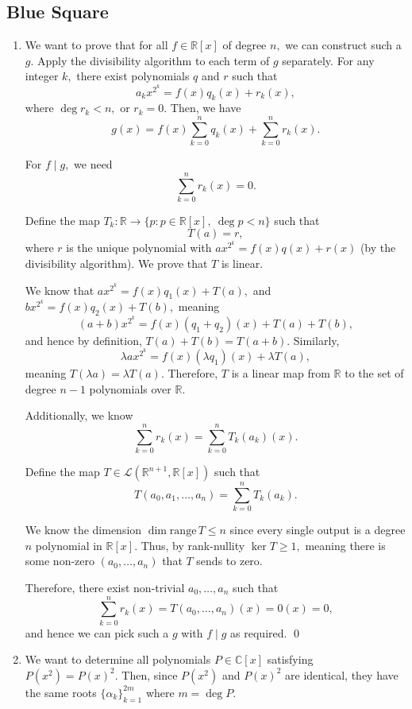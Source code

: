 \documentclass[12pt]{article}
\begin{document}
\subsection{Blue Square}
\begin{enumerate}
  \item[6] We want to prove that for all $f \in \mathbb R[x]$ of
    degree $n,$ we can construct such a $g.$ Apply the divisibility
    algorithm to each term of $g$ separately. For any integer $k,$
    there exist polynomials $q$ and $r$ such that
    $$
    a_kx^{2^k} = f(x) q_k(x) + r_k(x),
    $$
    where $\deg r_k < n,$ or $r_k = 0.$ Then, we have
    $$
    g(x) = f(x) \sum_{k = 0}^{n} q_k(x) + \sum_{k = 0}^{n}r_k(x).
    $$

    For $f \mid g, $ we need $$\sum_{k = 0}^{n} r_k(x) = 0.$$

    Define the map $T_k: \mathbb R  \to \{p : p \in \mathbb R[x],
    \ \deg p < n\}$ such that
    $$
    T(a) = r,
    $$
    where $r$ is the unique polynomial with $a x^{2^k} = f(x) q(x) +
    r(x)$ (by the divisibility algorithm). We prove that $T$ is linear.

    We know that $ax^{2^k} = f(x) q_1(x) + T(a),$ and $bx^{2^k} =
    f(x) q_2(x) + T(b),$ meaning $$
    (a+b)x^{2^k} = f(x)(q_1 + q_2)(x) + T(a) + T(b),
    $$
    and hence by definition, $T(a) + T(b) = T(a + b).$ Similarly, $$
    \lambda ax^{2^k} = f(x) (\lambda q_1)(x) + \lambda T(a),
    $$
    meaning $T(\lambda a) = \lambda T(a).$ Therefore, $T$ is a linear
    map from $\mathbb R$ to the set of degree $n - 1$ polynomials
    over $\mathbb R.$

    Additionally, we know
    $$
    \sum_{k = 0}^{n} r_k(x) = \sum_{k = 0}^{n}T_k(a_k)(x).
    $$

    Define the map $T \in \mathcal L(\mathbb R^{n + 1}, \mathbb
    R[x])$ such that $$
    T(a_0,a_1, \ldots, a_{n}) = \sum_{k = 0}^{n} T_k(a_k).
    $$

    We know the dimension $\dim \text{range}\, T \leq n$ since every
    single output is a degree $n$ polynomial in $\mathbb R[x].$ Thus,
    by rank-nullity $\ker T \geq 1,$ meaning there is some non-zero
    $(a_0, \ldots, a_n)$ that $T$ sends to zero.

    Therefore, there exist non-trivial $a_0, \ldots,a_n$ such that $$
    \sum_{k = 0}^{n}r_k(x) = T(a_0, \ldots, a_n)(x) = 0(x) = 0,
    $$
    and hence we can pick such a $g$ with $f \mid g$ as required. \qed

  \item[9] We want to determine all polynomials $P \in \mathbb C[x]$
    satisfying $P(x^2) = P(x)^2.$ Then, since $P(x^2)$ and $P(x)^2$
    are identical, they have the same roots $\{\alpha_k\}_{k =
    1}^{2m}$ where $m = \deg P.$


\end{enumerate}
\end{document}

